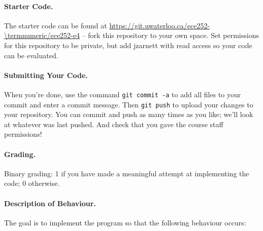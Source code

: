 \paragraph{Starter Code.} The starter code can be found at \url{https://git.uwaterloo.ca/ece252-\termnumeric/ece252-e4} -- fork this repository to your own space. Set permissions for this repository to be private, but add jzarnett with read access so your code can be evaluated.

\paragraph{Submitting Your Code.} When you're done, use the command \texttt{git commit -a} to add all files to your commit and enter a commit message. Then \texttt{git push} to upload your changes to your repository. You can commit and push as many times as you like; we'll look at whatever was last pushed. And check that you gave the course staff permissions!

\paragraph{Grading.} Binary grading: 1 if you have made a meaningful attempt at implementing the code; 0 otherwise.

\paragraph{Description of Behaviour.} The goal is to implement the program so that the following behaviour occurs:

